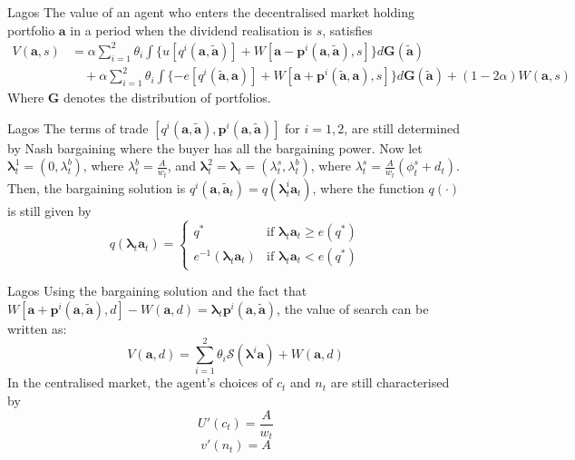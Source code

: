 \documentclass[aspectratio=169,xcolor=dvipsnames]{beamer}
\begin{document}
\begin{frame}{Lagos}
    The value of an agent who enters the decentralised market holding portfolio $\mathbf{a}$ in a period when the dividend realisation is $s$, satisfies
    \begin{align*}
        V(\mathbf{a}, s) &= \alpha \sum_{i=1}^2 \theta_i \int \{u[q^i(\mathbf{a}, \tilde{\mathbf{a}})] + W[\mathbf{a} - \mathbf{p}^i(\mathbf{a}, \tilde{\mathbf{a}}), s]\} d\mathbf{G}(\tilde{\mathbf{a}}) \\
        &\quad + \alpha \sum_{i=1}^2 \theta_i \int \{-e[q^i(\tilde{\mathbf{a}}, \mathbf{a})] + W[\mathbf{a} + \mathbf{p}^i(\tilde{\mathbf{a}}, \mathbf{a}), s]\} d\mathbf{G}(\tilde{\mathbf{a}}) + (1 - 2\alpha) W(\mathbf{a}, s)
    \end{align*}
    Where $\mathbf{G}$ denotes the distribution of portfolios.
\end{frame}

\begin{frame}{Lagos}
    The terms of trade $[q^i(\mathbf{a}, \tilde{\mathbf{a}}), \mathbf{p}^i(\mathbf{a}, \tilde{\mathbf{a}})]$ for $i = 1, 2$, are still determined by Nash bargaining where the buyer has all the bargaining power. Now let $\boldsymbol{\lambda}^1_t = (0, \lambda^b_t)$, where $\lambda^b_t = \frac{A}{w_t}$, and $\boldsymbol{\lambda}^2_t = \boldsymbol{\lambda}_t = (\lambda^s_t, \lambda^b_t)$, where $\lambda^s_t = \frac{A}{w_t}(\phi^s_t + d_t)$. Then, the bargaining solution is $q^i(\mathbf{a}, \tilde{\mathbf{a}}_t) = q(\boldsymbol{\lambda}^i_t \mathbf{a}_t)$, where the function $q(\cdot)$ is still given by
    \[
        q(\boldsymbol{\lambda}_t \mathbf{a}_t) = \begin{cases} q^* & \text{if } \boldsymbol{\lambda}_t \mathbf{a}_t \ge e(q^*) \\ e^{-1}(\boldsymbol{\lambda}_t \mathbf{a}_t) & \text{if } \boldsymbol{\lambda}_t \mathbf{a}_t < e(q^*) \end{cases}
    \]
\end{frame}

\begin{frame}{Lagos}
    Using the bargaining solution and the fact that $W[\mathbf{a} + \mathbf{p}^i(\mathbf{a}, \tilde{\mathbf{a}}), d] - W(\mathbf{a}, d) = \boldsymbol{\lambda}_t \mathbf{p}^i(\mathbf{a}, \tilde{\mathbf{a}})$, the value of search can be written as:
    \[
        V(\mathbf{a}, d) = \sum_{i=1}^2 \theta_i \mathcal{S}(\boldsymbol{\lambda}^i \mathbf{a}) + W(\mathbf{a}, d)
    \]
    In the centralised market, the agent's choices of $c_t$ and $n_t$ are still characterised by
    \[
        U'(c_t) = \frac{A}{w_t}
    \]
    \[
        v'(n_t) = A
    \]
\end{frame}
\end{document}
